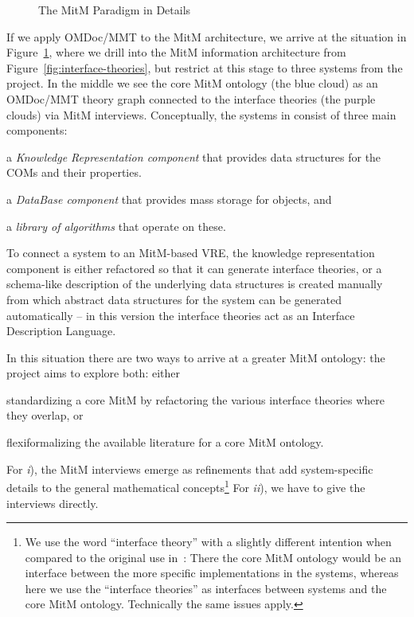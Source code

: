 \begin{figure}[ht]\centering
  
  \caption{The MitM Paradigm in Details}\label{fig:mitm}
\end{figure}
If we apply OMDoc/MMT to the MitM architecture, we arrive at the situation in
Figure~\ref{fig:mitm}, where we drill into the MitM information architecture from
Figure~\ref{fig:interface-theories}, but restrict at this stage to three systems from the \ODK
project. In the middle we see the core MitM ontology (the blue cloud) as an OMDoc/MMT
theory graph connected to the interface theories (the purple clouds) via MitM
interviews. Conceptually, the systems in \ODK consist of three main components:
\begin{compactenum}[\em i\rm)]
\item a \emph{Knowledge Representation component} that provides data structures for the
  COMs and their properties.
\item a \emph{DataBase component} that provides mass storage for objects, and 
\item a \emph{library of algorithms} that operate on these.
\end{compactenum}
To connect a system to an MitM-based VRE, the knowledge representation component is either
refactored so that it can generate interface theories, or a schema-like description of the
underlying data structures is created manually from which abstract data structures for the
system can be generated automatically -- in this version the interface theories act as an
Interface Description Language.

In this situation there are two ways to arrive at a greater MitM ontology: the \ODK
project aims to explore both: either
\begin{inparaenum}[\em i\rm)] 
\item standardizing a core MitM by refactoring the various interface theories where they
  overlap, or
\item flexiformalizing the available literature for a core MitM ontology.
\end{inparaenum}
For \emph{i}), the MitM interviews emerge as refinements that add system-specific details
to the general mathematical concepts\footnote{We use the word ``interface theory'' with a
  slightly different intention when compared to the original use
  in~\cite{KohRabSac:fvip11}: There the core MitM ontology would be an interface between
  the more specific implementations in the systems, whereas here we use the ``interface
  theories'' as interfaces between systems and the core MitM ontology. Technically the
  same issues apply.} For \emph{ii}), we have to give the interviews directly. 


